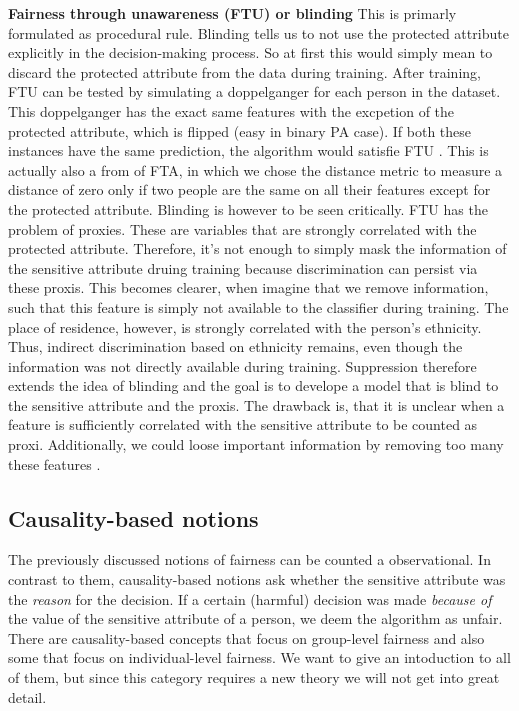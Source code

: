 \textbf{Fairness through unawareness (FTU) or blinding}
This is primarly formulated as procedural rule. Blinding tells us to not use the protected attribute explicitly in the decision-making process. So at first this would simply mean to discard the protected attribute from the data during training. After training, FTU can be tested by simulating a doppelganger for each person in the dataset. This doppelganger has the exact same features with the excpetion of the protected attribute, which is flipped (easy in binary PA case). If both these instances have the same prediction, the algorithm would satisfie FTU \cite{verma2018}. This is actually also a from of FTA, in which we chose the distance metric to measure a distance of zero only if two people are the same on all their features except for the protected attribute. Blinding is however to be seen critically.
FTU has the problem of proxies. These are variables that are strongly correlated with the protected attribute. Therefore, it's not enough to simply mask the information of the sensitive attribute druing training because discrimination can persist via these proxis. This becomes clearer, when imagine that we remove information, such that this feature is simply not available to the classifier during training. The place of residence, however, is strongly correlated with the person's ethnicity. Thus, indirect discrimination based on ethnicity remains, even though the information was not directly available during training. Suppression therefore extends the idea of blinding and the goal is to develope a model that is blind to the sensitive attribute and the proxis. The drawback is, that it is unclear when a feature is sufficiently correlated with the sensitive attribute to be counted as proxi. Additionally, we could loose important information by removing too many these features \cite{castelnovo2022}.

\subsection*{Causality-based notions}
The previously discussed notions of fairness can be counted a observational. In contrast to them, causality-based notions ask whether the sensitive attribute was the \textit{reason} for the decision. If a certain (harmful) decision was made \textit{because of} the value of the sensitive attribute of a person, we deem the algorithm as unfair.
There are causality-based concepts that focus on group-level fairness and also some that focus on individual-level fairness. We want to give an intoduction to all of them, but since this category requires a new theory we will not get into great detail.

